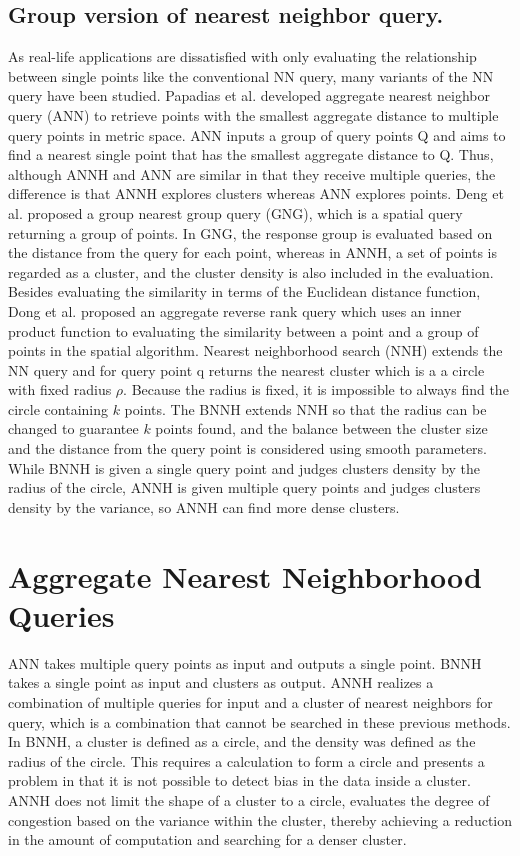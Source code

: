 \documentclass[a4paper,11pt]{report}
\theoremstyle{mytheoremstyle}
\begin{document}
\section{Group version of nearest neighbor query.}
As real-life applications are dissatisfied with only evaluating the relationship between single points like the conventional NN query, many variants of the NN query have been studied. Papadias et al. developed aggregate nearest neighbor query (ANN) \cite{ANN} to retrieve points with the smallest aggregate distance to multiple query points in metric space. ANN inputs a group of query points Q and aims to find a nearest single point that has the smallest aggregate distance to Q. Thus, although ANNH and ANN are similar in that they receive multiple queries, the difference is that ANNH explores clusters whereas ANN explores points. Deng et al. \cite{GNG} proposed a group nearest group query (GNG), which is a spatial query returning a group of points. In GNG, the response group is evaluated based on the distance from the query for each point, whereas in ANNH, a set of points is regarded as a cluster, and the cluster density is also included in the evaluation. Besides evaluating the similarity in terms of the Euclidean distance function, Dong et al. \cite{dong2017grid} proposed an aggregate reverse rank query which uses an inner product function to evaluating the similarity between a point and a group of points in the spatial algorithm. Nearest neighborhood search (NNH) \cite{NNH} extends the NN query and for query point q returns the nearest cluster which is a a circle with fixed radius $\rho$. Because the radius is fixed, it is impossible to
always find the circle containing $k$ points. The BNNH \cite{BNNH} extends NNH so that the radius can be changed to guarantee $k$ points found, and the balance between the cluster size and the distance from the query point is considered using smooth parameters. While BNNH is given a single query point and judges clusters density by the radius of the circle, ANNH is given multiple query points and judges clusters density by the variance, so ANNH can find more dense clusters.

\chapter{Aggregate Nearest Neighborhood Queries}
\label{section:annh}
ANN \cite {ANN} takes multiple query points as input and outputs a single point. BNNH \cite{BNNH} takes a single point as input and clusters as output. ANNH realizes a combination of multiple queries for input and a cluster of nearest neighbors for query, which is a combination that cannot be searched in these previous methods.
In BNNH, a cluster is defined as a circle, and the density was defined as the radius of the circle. This requires a calculation to form a circle and presents a problem in that it is not possible to detect bias in the data inside a cluster. ANNH does not limit the shape of a cluster to a circle, evaluates the degree of congestion based on the variance within the cluster, thereby achieving a reduction in the amount of computation and searching for a denser cluster.
\end{document}
